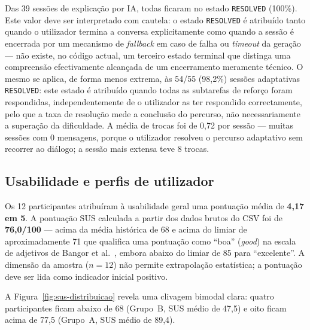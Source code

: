 Das 39 sessões de explicação por IA, todas ficaram no estado \texttt{RESOLVED} (100\%). Este valor deve ser interpretado com cautela: o estado \texttt{RESOLVED} é atribuído tanto quando o utilizador termina a conversa explicitamente como quando a sessão é encerrada por um mecanismo de \emph{fallback} em caso de falha ou \emph{timeout} da geração --- não existe, no código actual, um terceiro estado terminal que distinga uma compreensão efectivamente alcançada de um encerramento meramente técnico. O mesmo se aplica, de forma menos extrema, às 54/55 (98,2\%) sessões adaptativas \texttt{RESOLVED}: este estado é atribuído quando todas as subtarefas de reforço foram respondidas, independentemente de o utilizador as ter respondido correctamente, pelo que a taxa de resolução mede a conclusão do percurso, não necessariamente a superação da dificuldade. A média de trocas foi de 0,72 por sessão --- muitas sessões com 0 mensagens, porque o utilizador resolveu o percurso adaptativo sem recorrer ao diálogo; a sessão mais extensa teve 8 trocas.

\subsection{Usabilidade e perfis de utilizador}
\label{ssec:sus}

Os 12 participantes atribuíram à usabilidade geral uma pontuação média de \textbf{4,17 em 5}. A pontuação SUS calculada a partir dos dados brutos do CSV foi de \textbf{76,0/100} --- acima da média histórica de 68 e acima do limiar de aproximadamente 71 que qualifica uma pontuação como ``boa'' (\emph{good}) na escala de adjetivos de Bangor et al.~\cite{bangor2008empirical}, embora abaixo do limiar de 85 para ``excelente''. A dimensão da amostra ($n=12$) não permite extrapolação estatística; a pontuação deve ser lida como indicador inicial positivo.

A Figura~\ref{fig:sus-distribuicao} revela uma clivagem bimodal clara: quatro participantes ficam abaixo de 68 (Grupo~B, SUS médio de 47,5) e oito ficam acima de 77,5 (Grupo~A, SUS médio de 89,4).

